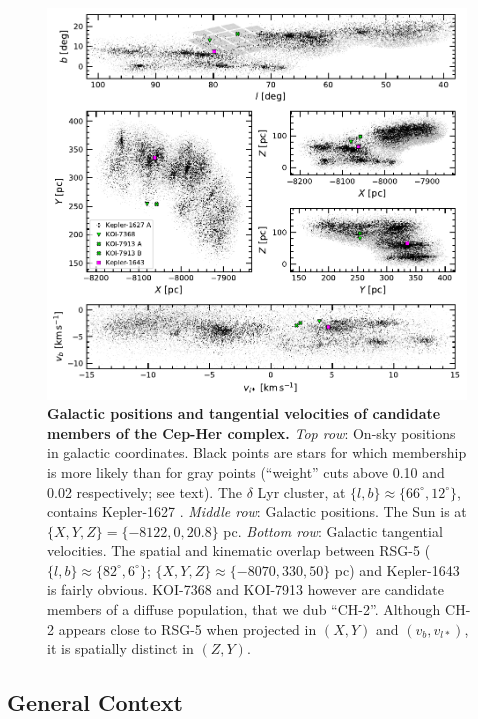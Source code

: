 \documentclass[12pt,twocolumn,linenumbers]{aastex63}
\begin{document}
\begin{figure}[t]
	\begin{center}
		\leavevmode
		\includegraphics[width=0.99\textwidth]{f1.pdf}
	\end{center}
	\vspace{-0.7cm}
	\caption{
    {\bf Galactic positions  and tangential velocities of candidate members of the
    Cep-Her complex.}
	{\it Top row}: On-sky positions in galactic coordinates.
	Black points are stars for which membership is more likely than for
	gray points (``weight'' cuts above 0.10 and 0.02 respectively; see text).
	The $\delta$ Lyr cluster, at $\{ l, b\} \approx \{ 66^\circ, 12^\circ\}$, contains Kepler-1627  \citep{bouma_kep1627_2022}.
	{\it Middle row}:
	Galactic positions.
	The Sun is at $\{X, Y, Z\} = \{-8122, 0, 20.8\}$ pc.
	{\it Bottom row}:
	Galactic tangential velocities.
	The spatial and kinematic overlap between RSG-5 ($\{ l, b\} \approx \{ 82^\circ, 6^\circ\}$; $\{ X, Y, Z\} \approx \{-8070, 330, 50\} $ pc)
	and Kepler-1643 is fairly obvious.
	KOI-7368 and KOI-7913 however are candidate members of a diffuse population,
	that we dub ``CH-2''.
	Although CH-2 appears close to RSG-5 when projected in $(X,Y)$ and $(v_b, v_{l*})$,
	it is spatially  distinct in $(Z,Y)$.
	\label{fig:XYZvtang}
	}
\end{figure}

\subsection{General Context} %
\end{document}
